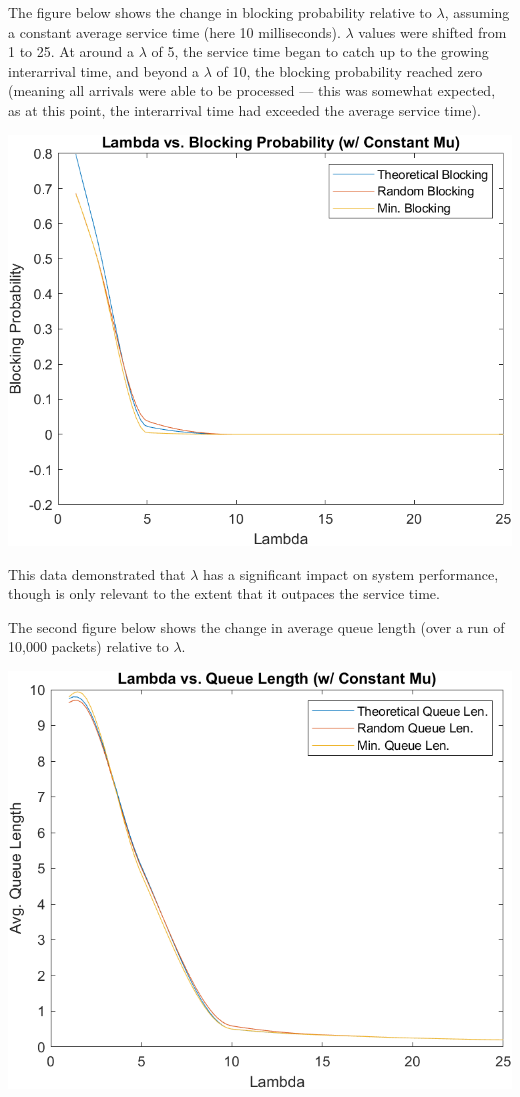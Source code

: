 \documentclass[11pt]{article} %
\begin{document}
The figure below shows the change in blocking probability relative to $\lambda$, assuming a constant average service time (here 10 milliseconds). $\lambda$ values were shifted from 1 to 25. At around a $\lambda$ of 5, the service time began to catch up to the growing interarrival time, and beyond a $\lambda$ of 10, the blocking probability reached zero (meaning all arrivals were able to be processed — this was somewhat expected, as at this point, the interarrival time had exceeded the average service time).

\begin{center}
\includegraphics[width=.875\textwidth]{1}
\end{center}

This data demonstrated that $\lambda$ has a significant impact on system performance, though is only relevant to the extent that it outpaces the service time.

The second figure below shows the change in average queue length (over a run of 10,000 packets) relative to $\lambda$.

\begin{center}
\includegraphics[width=.875\textwidth]{2}
\end{center}
\end{document}
